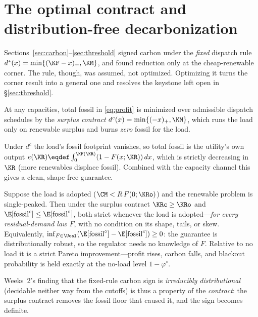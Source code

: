 \section{The optimal contract and distribution-free decarbonization}\label{sec:optcontract}

Sections~\ref{sec:carbon}--\ref{sec:threshold} signed carbon under the \emph{fixed}
dispatch rule $d^{*}(x)=\min\{(\KF-x)_+,\KM\}$, and found reduction only at the
cheap-renewable corner. The rule, though, was assumed, not optimized. Optimizing it
turns the corner result into a general one and resolves the keystone left open in
\S\ref{sec:threshold}.

\begin{proposition}\label{prop:surplus}
At any capacities, total fossil in \eqref{eq:profit} is minimized over admissible
dispatch schedules by the \emph{surplus contract} $d^{c}(x)=\min\{(-x)_+,\KM\}$, which
runs the load only on renewable surplus and burns \emph{zero} fossil for the load.
\end{proposition}

Under $d^{c}$ the load's fossil footprint vanishes, so total fossil is the utility's own
output $e(\KR)\eqdef\int_0^{\KF(\KR)}(1-F(x;\KR))\,dx$, which is strictly decreasing in
$\KR$ (more renewables displace fossil). Combined with the capacity channel this gives a
clean, shape-free guarantee.

\begin{theorem}\label{thm:decarb}
Suppose the load is adopted ($\CM<R\,F(0;\KRo)$) and the renewable problem is
single-peaked. Then under the surplus contract $\KRc\ge\KRo$ and
$\E[\text{fossil}^{c}]\le\E[\text{fossil}^{\circ}]$, both strict whenever the load is
adopted---\emph{for every residual-demand law $F$}, with no condition on its shape, tails,
or skew. Equivalently, $\inf_{F\in\Ucal}(\E[\text{fossil}^{\circ}]-\E[\text{fossil}^{c}])\ge0$:
the guarantee is distributionally robust, so the regulator needs no knowledge of $F$.
Relative to no load it is a strict Pareto improvement---profit rises, carbon falls, and
blackout probability is held exactly at the no-load level $1-\varphi^{\circ}$.
\end{theorem}

Weeks~2's finding that the fixed-rule carbon sign is \emph{irreducibly distributional}
(decidable neither way from the cutoffs) is thus a property of the \emph{contract}: the
surplus contract removes the fossil floor that caused it, and the sign becomes definite.

